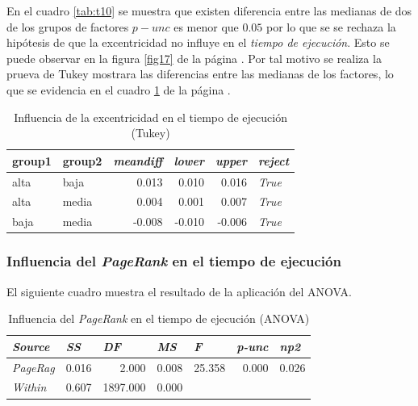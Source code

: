 \documentclass{article}
\begin{document}
En el cuadro \ref{tab:t10} se muestra que existen  diferencia entre las medianas de dos de los grupos de factores  \textbf{$p-unc$} es menor que $0.05$ por lo que se se rechaza la hipótesis de que la excentricidad no influye en el \textit{tiempo de ejecución}. Esto se puede observar en la figura \ref{fig17} de la página \pageref{fig17}. Por tal motivo se realiza la prueva de Tukey mostrara las diferencias entre las medianas de los factores, lo que se evidencia en el cuadro \ref{tab:t11} de la página \pageref{tab:t11}.

\begin{table}[htbp]
  \centering
  \caption{Influencia de la excentricidad en el tiempo de ejecución (Tukey)}
    \begin{tabular}{llrrrl}
    \toprule
    \textbf{group1} & \textbf{group2} & \multicolumn{1}{l}{\textit{\textbf{meandiff}}} & \multicolumn{1}{l}{\textit{\textbf{lower}}} & \multicolumn{1}{l}{\textit{\textbf{upper}}} & \textit{\textbf{reject}} \\
    \midrule
    alta  & baja  & 0.013 & 0.010 & 0.016 & \textit{True} \\
    alta  & media & 0.004 & 0.001 & 0.007 & \textit{True} \\
    baja  & media & -0.008 & -0.010 & -0.006 & \textit{True} \\
    \bottomrule
    \end{tabular}%
  \label{tab:t11}%
\end{table}%

\subsubsection{Influencia del \textit{PageRank} en el tiempo de ejecución}

El siguiente cuadro muestra el resultado de la aplicación del ANOVA.

\begin{table}[htbp]
  \centering
  \caption{Influencia del \textit{PageRank} en el tiempo de ejecución (ANOVA)}
    \begin{tabular}{lrrrrrr}
    \toprule
    \textit{\textbf{Source}} & \multicolumn{1}{l}{\textit{\textbf{SS}}} & \multicolumn{1}{l}{\textit{\textbf{DF}}} & \multicolumn{1}{l}{\textit{\textbf{MS}}} & \multicolumn{1}{l}{\textit{\textbf{F}}} & \multicolumn{1}{l}{\textit{\textbf{p-unc}}} & \multicolumn{1}{l}{\textit{\textbf{np2}}} \\
    \midrule
    \textit{PageRag} & 0.016 & 2.000 & 0.008 & 25.358 & 0.000 & 0.026 \\
    \textit{Within} & 0.607 & 1897.000 & 0.000 &       &       &  \\
    \bottomrule
    \end{tabular}%
  \label{tab:t12}%
\end{table}%
\end{document}
